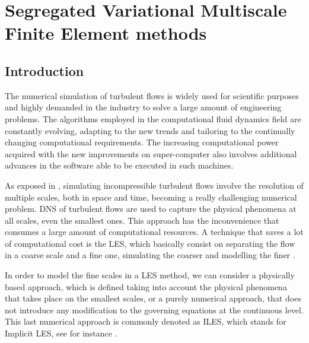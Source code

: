 \chapter{Segregated Variational Multiscale Finite Element methods}
\label{chap-SVMS}

\section{Introduction}
\label{sec-C7_intro}

The numerical simulation of turbulent flows is widely used for scientific purposes and highly demanded in the industry to solve a large amount of engineering problems. The algorithms employed in the computational fluid dynamics field are constantly evolving, adapting to the new trends and tailoring to the continually changing computational requirements. The increasing computational power acquired with the new improvements on super-computer also involves additional advances in the software able to be executed in such machines.

As exposed in , simulating incompressible turbulent flows involve the resolution of multiple scales, both in space and time, becoming a really challenging numerical problem. DNS of turbulent flows are used to capture the physical phenomena at all scales, even the smallest ones. This approach has the inconvenience that consumes a large amount of computational resources. A technique that saves a lot of computational cost is the LES, which basically consist on separating the flow in a coarse scale and a fine one, simulating the coarser and modelling the finer \cite{sagaut_large_2000}. 

In order to model the fine scales in a LES method, we can consider a physically based approach, which is defined taking into account the physical phenomena that takes place on the smallest scales, or a purely numerical approach, that does not introduce any modification to the governing equations at the continuous level. This last numerical approach is commonly denoted as ILES, which stands for Implicit LES, see for instance \cite{boris_new_1992}.

